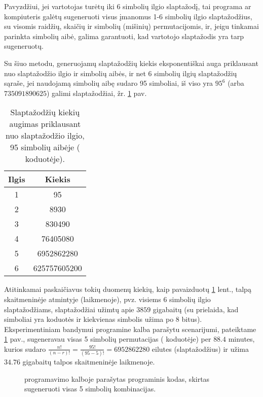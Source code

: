 \documentclass{VUMIFInfBakalaurinis}
\begin{document}
Pavyzdžiui, jei vartotojas turėtų iki 6 simbolių ilgio slaptažodį, tai programa 
ar kompiuteris galėtų sugeneruoti visus įmanomus 1-6 simbolių ilgio 
slaptažodžius, su visomis raidžių, skaičių ir simbolių (mišinių) permutacijomis, 
ir, jeigu tinkamai parinkta simbolių aibė, galima garantuoti, kad vartotojo 
slaptažodis yra tarp sugeneruotų.

Su šiuo metodu, generuojamų slaptažodžių kiekis eksponentiškai auga priklausant 
nuo slaptažodžio ilgio ir simbolių aibės, ir net 6 simbolių ilgių slaptažodžių 
sąraše, jei naudojamą simbolių aibę sudaro 95 simboliai, iš viso yra $95^6$ 
(arba $735091890625$) galimi slaptažodžiai, žr. \ref{tab:bruteforce} pav.

\begin{table}[hb]
  \centering
  \caption{
    Slaptažodžių kiekių augimas priklausant nuo slaptažodžio ilgio, 95 simbolių 
    aibėje ( koduotėje).
  }
  \begin{tabular}{|c|c|}
    \hline \textbf{Ilgis} & \textbf{Kiekis} \\
    \hline 1 & 95 \\
    \hline 2 & 8930 \\
    \hline 3 & 830490 \\
    \hline 4 & 76405080 \\
    \hline 5 & 6952862280 \\
    \hline 6 & 625757605200 \\
    \hline
  \end{tabular}
  \label{tab:bruteforce}
\end{table}

Atitinkamai paskaičiavus tokių duomenų kiekių, kaip pavaizduotų 
\ref{tab:bruteforce} lent., talpą skaitmeninėje atmintyje (laikmenoje), pvz. 
visiems 6 simbolių ilgio slaptažodžiams, slaptažodžiai užimtų apie $3859$ 
gigabaitų (su prielaida, kad simboliai yra  koduotės ir 
kiekvienas simbolis užima po 8 bitus). Eksperimentiniam bandymui 
 programine kalba parašytu scenarijumi, pateiktame 
\ref{fig:permutacijos} pav., sugeneravau visas 5 simbolių permutacijas 
( koduotėje) per $88.4$ minutes, kurios sudaro 
$\frac{n!}{(n-r)!}=\frac{95!}{(95 - 5)!}=6952862280$ eilutes (slaptažodžius) ir 
užima $34.76$ gigabaitų talpos skaitmeninėje laikmenoje.

\begin{figure}
  \begin{center}
    
    \caption{
       programavimo kalboje parašytas programinis kodas, 
      skirtas sugeneruoti visas 5 simbolių kombinacijas.
    }
    \label{fig:permutacijos}
  \end{center}
\end{figure}
\end{document}
